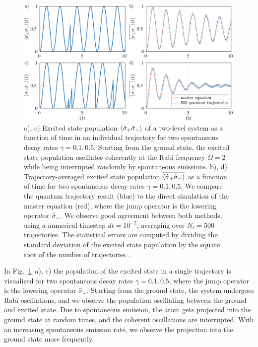 \begin{figure}[ht]
    \centering
    \includegraphics[width=\textwidth]{Chapters/Plots/Chapter3/Chapter2_Fig2.pdf}
    \caption{a), c) Excited state population $\langle\hat{\sigma}_+ \hat{\sigma}_-\rangle$ of a two-level system as a function of time in an individual trajectory for two spontaneous decay rates $\gamma = 0.1, 0.5$. Starting from the ground state, the excited state population oscillates coherently at the Rabi frequency $\Omega = 2$ while being interrupted randomly by spontaneous emissions. b), d) Trajectory-averaged excited state population $\overline{\langle\hat{\sigma}_+ \hat{\sigma}_-\rangle}$ as a function of time for two spontaneous decay rates $\gamma = 0.1, 0.5$. We compare the quantum trajectory result (blue) to the direct simulation of the master equation (red), where the jump operator is the lowering operator $\hat{\sigma}_-$. We observe good agreement between both methods, using a numerical timestep $dt=10^{-2}$, averaging over $N_t = 500$ trajectories. The statistical errors are computed by dividing the standard deviation of the excited state population by the square root of the number of trajectories \cite{daley2014}.}
    \label{fig:Chapter2_Fig2}
\end{figure}

In Fig.~\ref{fig:Chapter2_Fig2}~a), c) the population of the excited state in a single trajectory is visualized for two spontaneous decay rates $\gamma = 0.1, 0.5$, where the jump operator is the lowering operator $\hat{\sigma}_-$. Starting from the ground state, the system undergoes Rabi oscillations, and we observe the population oscillating between the ground and excited state. Due to spontaneous emission, the atom gets projected into the ground state at random times, and the coherent oscillations are interrupted. With an increasing spontaneous emission rate, we observe the projection into the ground state more frequently. 

